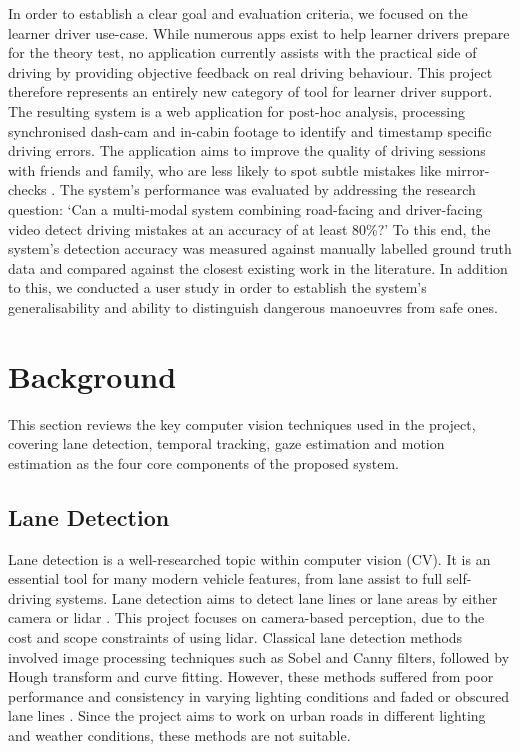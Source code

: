 \documentclass{article}
\begin{document}
In order to establish a clear goal and evaluation criteria, we focused on the learner driver use-case. While numerous apps exist to help learner drivers prepare for the theory test, no application currently assists with the practical side of driving by providing objective feedback on real driving behaviour. This project therefore represents an entirely new category of tool for learner driver support. The resulting system is a web application for post-hoc analysis, processing synchronised dash-cam and in-cabin footage to identify and timestamp specific driving errors. The application aims to improve the quality of driving sessions with friends and family, who are less likely to spot subtle mistakes like mirror-checks \cite{2nd2nonedrivingschoolLearningDrive}. The system's performance was evaluated by addressing the research question: `Can a multi-modal system combining road-facing and driver-facing video detect driving mistakes at an accuracy of at least 80\%?' To this end, the system's detection accuracy was measured against manually labelled ground truth data and compared against the closest existing work in the literature. In addition to this, we conducted a user study in order to establish the system's generalisability and ability to distinguish dangerous manoeuvres from safe ones.

\newpage

\section{Background}
This section reviews the key computer vision techniques used in the project, covering lane detection, temporal tracking, gaze estimation and motion estimation as the four core components of the proposed system.

\subsection{Lane Detection}
Lane detection is a well-researched topic within computer vision (CV). It is an essential tool for many modern vehicle features, from lane assist to full self-driving systems. Lane detection aims to detect lane lines or lane areas by either camera or lidar \cite{tang_review_2021}. This project focuses on camera-based perception, due to the cost and scope constraints of using lidar. Classical lane detection methods involved image processing techniques such as Sobel \cite{sobel_1968} and Canny \cite{canny_1986} filters, followed by Hough transform \cite{duda_1972} and curve fitting. However, these methods suffered from poor performance and consistency in varying lighting conditions and faded or obscured lane lines \cite{hillel_2014}. Since the project aims to work on urban roads in different lighting and weather conditions, these methods are not suitable. 
\end{document}
